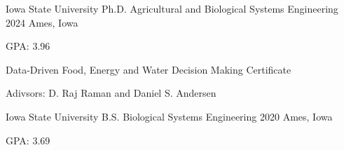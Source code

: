 

\begin{cventries}

  \cventry
    {Iowa State University} %
    {Ph.D. Agricultural and Biological Systems Engineering} %
    {2024} %
    {Ames, Iowa} %
    {
      \begin{cvitems} %
      \setlength\itemsep{.4em}
        \item {GPA: 3.96}
        \item {Data-Driven Food, Energy and Water Decision Making Certificate}
        \item {Adivsors: D. Raj Raman and Daniel S. Andersen}
      \end{cvitems}
    }
\vspace*{.5cm}
\cventry
    {Iowa State University} %
    {B.S. Biological Systems Engineering} %
    {2020} %
    {Ames, Iowa} %
    {
      \begin{cvitems} %
      \setlength\itemsep{.4em}
        \item {GPA: 3.69}
      \end{cvitems}
    }
\end{cventries}
